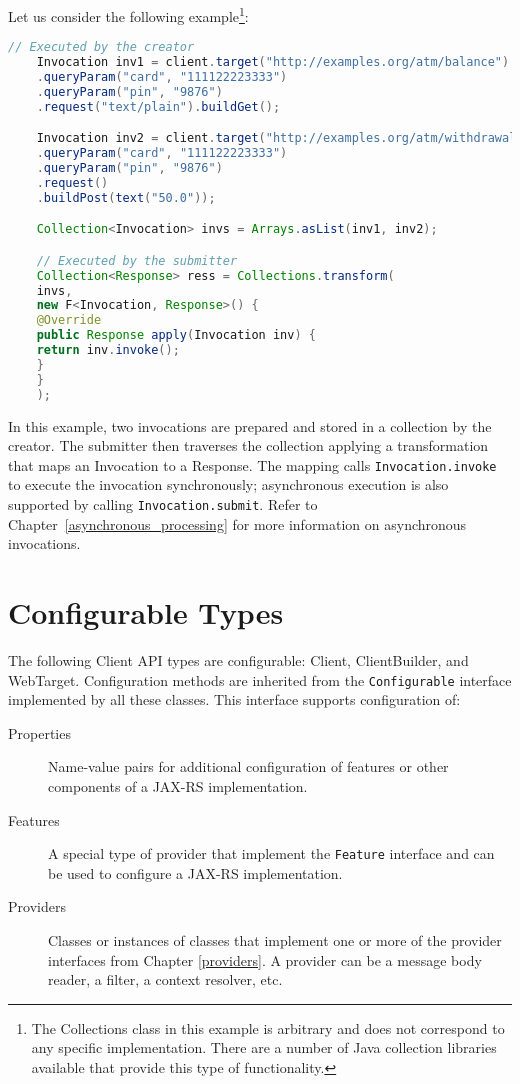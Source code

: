 Let us consider the following example\footnote{The Collections class in this example is arbitrary and does not
correspond to any specific implementation. There are a number of Java collection libraries available that provide this
type of functionality.}:

\begin{lstlisting}[language=Java]
    // Executed by the creator
    Invocation inv1 = client.target("http://examples.org/atm/balance")
    .queryParam("card", "111122223333")
    .queryParam("pin", "9876")
    .request("text/plain").buildGet();

    Invocation inv2 = client.target("http://examples.org/atm/withdrawal")
    .queryParam("card", "111122223333")
    .queryParam("pin", "9876")
    .request()
    .buildPost(text("50.0"));

    Collection<Invocation> invs = Arrays.asList(inv1, inv2);

    // Executed by the submitter
    Collection<Response> ress = Collections.transform(
    invs,
    new F<Invocation, Response>() {
    @Override
    public Response apply(Invocation inv) {
    return inv.invoke();
    }
    }
    );
\end{lstlisting}

In this example, two invocations are prepared and stored in a collection by the creator. The submitter then traverses
the collection applying a transformation that maps an Invocation to a Response. The mapping calls
\lstinline{Invocation.invoke} to execute the invocation synchronously; asynchronous execution is also supported by
calling \lstinline{Invocation.submit}. Refer to Chapter~\ref{asynchronous_processing} for more information on
asynchronous invocations.

\section{Configurable Types}
\label{configurable_types}

The following Client API types are configurable: Client, ClientBuilder, and WebTarget. Configuration methods are
inherited from the \lstinline{Configurable} interface implemented by all these classes. This interface supports
configuration of:

\begin{description}
    \item [Properties] Name-value pairs for additional configuration of features or other components of a JAX-RS
    implementation.
    \item [Features] A special type of provider that implement the \lstinline{Feature} interface and can be used to
    configure a JAX-RS implementation.
    \item [Providers] Classes or instances of classes that implement one or more of the provider interfaces from
    Chapter \ref{providers}. A provider can be a message body reader, a filter, a context resolver, etc.
\end{description}

